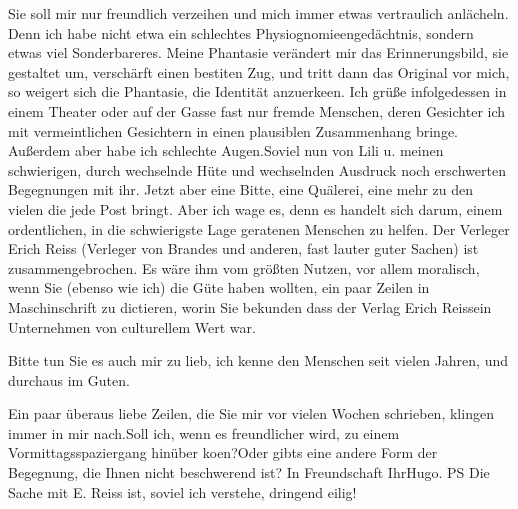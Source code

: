 \pstart
           Sie soll mir nur freundlich verzeihen und mich immer etwas vertraulich anlächeln.
               Denn ich habe nicht etwa ein schlechtes Physiognomieengedächtnis, sondern etwas viel
               Sonderbareres. Meine Phantasie verändert mir das Erinnerungsbild, sie gestaltet um,
               verschärft einen besti{\geminationm}ten Zug, und tritt dann das
               Original vor mich, so weigert sich die Phantasie, die Identität anzuerke{\geminationn}en. Ich grüße infolgedessen in einem Theater oder auf
               der Gasse fast nur fremde Menschen, deren Gesichter ich mit vermeintlichen Gesichtern
               in einen plausiblen {\pb}Zusammenhang
               bringe. Außerdem aber habe ich schlechte Augen.\hspace*{1.5em}Soviel nun von Lili u. meinen schwierigen,
               durch wechselnde Hüte und wechselnden Ausdruck noch erschwerten Begegnungen mit ihr.
               Jetzt aber eine Bitte, eine Quälerei, eine mehr zu den vielen die jede Post bringt.
               Aber ich wage es, denn es handelt sich darum, einem ordentlichen, in die schwierigste
               Lage geratenen Menschen zu helfen. Der Verleger Erich Reiss (Verleger von Brandes und
               anderen, fast lauter guter Sachen) ist zusammengebrochen. Es wäre ihm vom größten
               Nutzen, vor allem moralisch, wenn Sie (ebenso wie ich) die Güte haben wollten, ein
               paar Zeilen in Maschinschrift zu dictieren, worin Sie bekunden dass der Verlag Erich Reissein Unternehmen von culturellem
               Wert war.\pend
           
\pstart
           Bitte tun Sie es auch mir zu lieb, ich kenne den Menschen seit vielen Jahren, und
               durchaus im Guten.\pend
           
\pstart
           Ein paar überaus liebe Zeilen, die Sie mir vor vielen Wochen schrieben, klingen immer
               in mir nach.\hspace*{1.5em}Soll ich, wenn es freundlicher wird, zu
               einem Vormittagsspaziergang hinüber ko{\geminationm}en?\hspace*{1.5em}Oder gibts eine andere Form der Begegnung, die Ihnen
               nicht beschwerend ist? \pend
           \pstart In Freundschaft Ihr\spacefill\mbox{Hugo.}\pend{}
\pstart
           \noindent{}PS Die Sache mit E. Reiss ist, soviel ich
                  verstehe, dringend eilig!\pend
           \endnumbering{}  
      